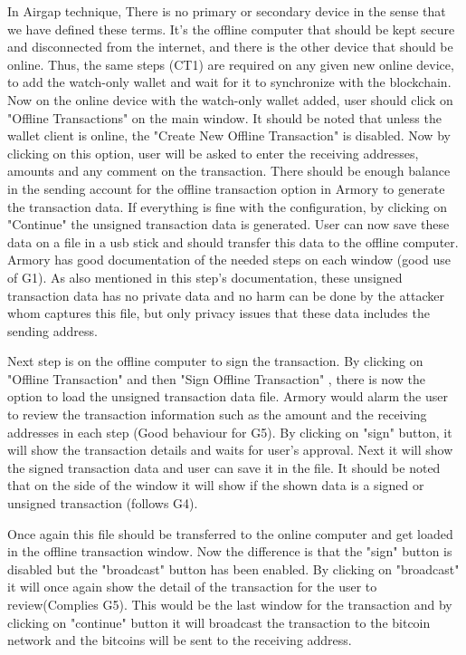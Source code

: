 In Airgap technique, There is no primary or secondary device in the sense that we have defined these terms. It's the offline computer that should be kept secure and disconnected from the internet, and there is the other device that should be online. Thus, the same steps (CT1) are required on any given new online device, to add the watch-only wallet and wait for it to synchronize with the blockchain.\\
Now on the online device with the watch-only wallet added, user should click on "Offline Transactions" on the main window. It should be noted that unless the wallet client is online, the "Create New Offline Transaction" is disabled. Now by clicking on this option, user will be asked to enter the receiving addresses, amounts and any comment on the transaction. There should be enough balance in the sending account for the offline transaction option in Armory to generate the transaction data. If everything is fine with the configuration, by clicking on "Continue" the unsigned transaction data is generated. User can now save these data on a file in a usb stick and should transfer this data to the offline computer. Armory has good documentation of the needed steps on each window (good use of G1). As also mentioned in this step's documentation, these unsigned transaction data has no private data and no harm can be done by the attacker whom captures this file, but only privacy issues that these data includes the sending address.

Next step is on the offline computer to sign the transaction. By clicking on "Offline Transaction" and then "Sign Offline Transaction" , there is now the option to load the unsigned transaction data file. Armory would alarm the user to review the transaction information such as the amount and the receiving addresses in each step (Good behaviour for G5). By clicking on "sign" button, it will show the transaction details and waits for user's approval.  Next it will show the signed transaction data and user can save it in the file. It should be noted that on the side of the window it will show if the shown data is a signed or unsigned transaction (follows G4). 

Once again this file should be transferred to the online computer and get loaded in the offline transaction window. Now the difference is that the "sign" button is disabled but the "broadcast" button has been enabled. By clicking on "broadcast" it will once again show the detail of the transaction for the user to review(Complies G5). This would be the last window for the transaction and by clicking on "continue" button it will broadcast the transaction to the bitcoin network and the bitcoins will be sent to the receiving address.

